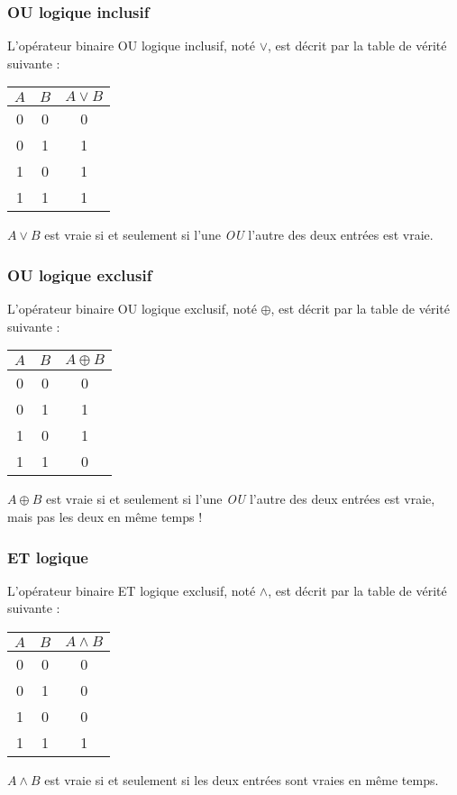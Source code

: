 \documentclass[../../main.tex]{subfiles}
\begin{document}
\subsubsection{OU logique inclusif}
\label{ssub:ou_logique_inclusif}
L'opérateur binaire OU logique inclusif, noté $\vee$, est décrit par la table de vérité suivante :
\begin{center}
\begin{tabular}{c|c|c}
$A$ & $B$ & $A\vee{B}$ \\
\hline
0 & 0 & 0 \\
0 & 1 & 1 \\
1 & 0 & 1 \\
1 & 1 & 1 \\
\end{tabular}
\end{center}
$A\vee{B}$ est vraie si et seulement si l'une \textit{OU} l'autre des deux entrées est vraie.
\subsubsection{OU logique exclusif}
\label{ssub:ou_logique_exclusif}
L'opérateur binaire OU logique exclusif, noté $\oplus$, est décrit par la table de vérité suivante :
\begin{center}
\begin{tabular}{c|c|c}
$A$ & $B$ & $A\oplus{B}$ \\
\hline
0 & 0 & 0 \\
0 & 1 & 1 \\
1 & 0 & 1 \\
1 & 1 & 0 \\
\end{tabular}
\end{center}
$A\oplus{B}$ est vraie si et seulement si l'une \textit{OU} l'autre des deux entrées est vraie, mais pas les deux en même temps !
\subsubsection{ET logique}
\label{ssub:et_logique}
L'opérateur binaire ET logique exclusif, noté $\wedge$, est décrit par la table de vérité suivante :
\begin{center}
\begin{tabular}{c|c|c}
$A$ & $B$ & $A\wedge{B}$ \\
\hline
0 & 0 & 0 \\
0 & 1 & 0 \\
1 & 0 & 0 \\
1 & 1 & 1 \\
\end{tabular}
\end{center}
$A\wedge{B}$ est vraie si et seulement si les deux entrées sont vraies en même temps.
\end{document}
